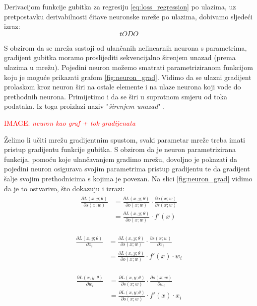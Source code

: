\documentclass[times, utf8, diplomski]{fer}
\def\pfrac#1#2{\frac{\partial #1}{\partial #2}}
\def\todoimg#1{\begin{center} \textcolor{red}{IMAGE: \textit{#1}} \end{center}}
\begin{document}
Derivacijom funkcije gubitka za regresiju \eqref{eq:loss_regression} po ulazima, uz pretpostavku derivabilnosti čitave neuronske mreže po ulazima, dobivamo sljedeći izraz:
\begin{equation}
tODO
\end{equation}

S obzirom da se mreža sastoji od ulančanih nelinearnih neurona s parametrima, gradijent gubitka moramo proslijediti sekvencijalno širenjem unazad (prema ulazima u mrežu). Pojedini neuron možemo smatrati parametriziranom funkcijom koju je moguće prikazati grafom \ref{fig:neuron_grad}. Vidimo da se ulazni gradijent prolaskom kroz neuron širi na ostale elemente i na ulaze neurona koji vode do prethodnih neurona. Primijetimo i da se širi u suprotnom smjeru od toka podataka. Iz toga proizlazi naziv "\textit{širenjem unazad}" .

\todoimg{neuron kao graf + tok gradijenata}
\label{fig:neuron_grad}

Želimo li učiti mrežu gradijentnim spustom, svaki parametar mreže treba imati pristup gradijentu funkcije gubitka. S obzirom da je neuron parametrizirana funkcija, pomoću koje ulančavanjem gradimo mrežu, dovoljno je pokazati da pojedini neuron osigurava svojim parametrima pristup gradijentu te da gradijent šalje svojim prethodnicima s kojima je povezan. Na slici \ref{fig:neuron_grad} vidimo da je to ostvarivo, što dokazuju i izrazi:
\begin{align}
\begin{split}
\pfrac{L(x,y;\theta)}{s(x;w)} &= \pfrac{L(x,y;\theta)}{o(x;w)} \cdot \pfrac{o(x;w)}{s(x;w)} \\
&= \pfrac{L(x,y;\theta)}{o(x;w)} \cdot f'(x)
\end{split}
\end{align}

\begin{align}
\begin{split}
\pfrac{L(x,y;\theta)}{x_i} &= \pfrac{L(x,y;\theta)}{s(x;w)} \cdot \pfrac{s(x;w)}{x_i} \\
&= \pfrac{L(x,y;\theta)}{o(x;w)} \cdot f'(x) \cdot w_i
\end{split}
\end{align}

\begin{align} \label{eq:w_update}
\begin{split}
\pfrac{L(x,y;\theta)}{w_i} &= \pfrac{L(x,y;\theta)}{s(x;w)} \cdot \pfrac{s(x;w)}{w_i} \\
&= \pfrac{L(x,y;\theta)}{o(x;w)} \cdot f'(x) \cdot x_i
\end{split}
\end{align}
\end{document}
